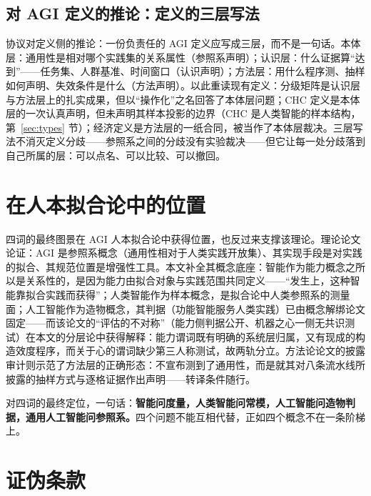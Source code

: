 \documentclass[10pt,fontset=fandol]{ctexart}
\begin{document}
\subsection{对 AGI 定义的推论：定义的三层写法}

协议对定义侧的推论：一份负责任的 AGI 定义应写成三层，而不是一句话。本体层：通用性是相对哪个实践集的关系属性（参照系声明）\cite{yu2026theory}；认识层：什么证据算“达到”——任务集、人群基准、时间窗口（认识声明）\cite{morris2023levels,hendrycks2025definition}；方法层：用什么程序测、抽样如何声明、失效条件是什么（方法声明）\cite{salaudeen2025measurement,yu2026methodology}。以此重读现有定义：分级矩阵是认识层与方法层上的扎实成果，但以“操作化”之名回答了本体层问题\cite{morris2023levels}；CHC 定义是本体层的一次认真声明，但未声明其样本投影的边界（CHC 是人类智能的样本结构，第~\ref{sec:types} 节）；经济定义是方法层的一纸合同，被当作了本体层裁决\cite{openai2018charter}。三层写法不消灭定义分歧——参照系之间的分歧没有实验裁决——但它让每一处分歧落到自己所属的层：可以点名、可以比较、可以撤回。

\section{在人本拟合论中的位置}\label{sec:program}

四词的最终图景在 AGI 人本拟合论中获得位置，也反过来支撑该理论。理论论文论证：AGI 是参照系概念（通用性相对于人类实践开放集）、其实现手段是对实践的拟合、其规范位置是增强性工具\cite{yu2026theory}。本文补全其概念底座：智能作为能力概念之所以是关系性的，是因为能力由拟合对象与实践范围共同定义——“发生上，这种智能靠拟合实践而获得”\cite{yu2026theory}；人类智能作为样本概念，是拟合论中人类参照系的测量面；人工智能作为造物概念，其判据（功能智能服务人类实践）已由概念解绑论文固定\cite{yu2026twogoals}——而该论文的“评估的不对称”（能力侧判据公开、机器之心一侧无共识测试）在本文的分层论中获得解释：能力谓词既有明确的系统层归属，又有现成的构造效度程序，而关于心的谓词缺少第三人称测试，故两轨分立。方法论论文的披露审计\cite{yu2026methodology}则示范了方法层的正确形态：不宣布测到了通用性，而是就其对八条流水线所披露的抽样方式与逐格证据作出声明——转译条件随行。

对四词的最终定位，一句话：\textbf{智能问度量，人类智能问常模，人工智能问造物判据，通用人工智能问参照系。}四个问题不能互相代替，正如四个概念不在一条阶梯上。

\section{证伪条款}\label{sec:falsify}
\end{document}
